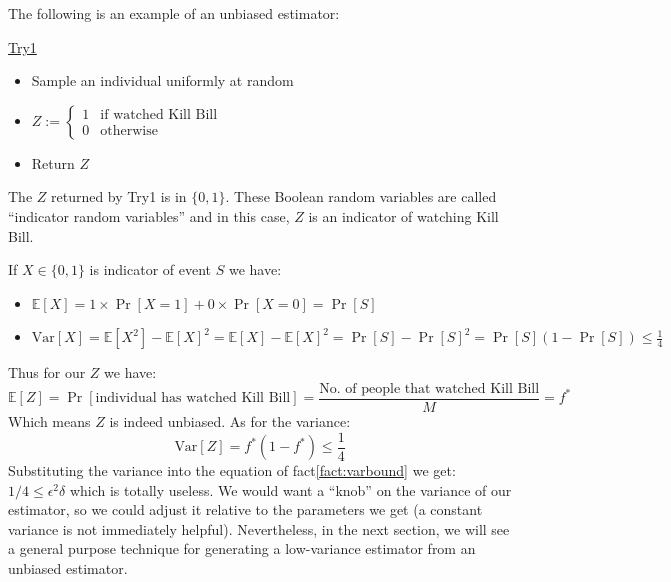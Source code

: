 \documentclass[11pt]{article}
\newcommand{\Ex}{\mathbb{E}}
\newcommand{\Var}{\text{Var}}
\begin{document}
The following is an example of an unbiased estimator:
\begin{mdframed}[backgroundcolor=blue!05,topline=false,bottomline=false,leftline=false,rightline=false] 
	\underline{\sc Try1}
	\begin{itemize}
		\item Sample an individual uniformly at random
		\item $ Z := \begin{cases} 1& \text{if watched Kill Bill}\\
		0 &\text{otherwise} \end{cases}$
		\item Return $Z$
	\end{itemize}
\end{mdframed}
The $Z$ returned by Try1 is in $\{0,1\}$. These Boolean random variables are called ``indicator random variables'' and in this case, $Z$ is an indicator of watching Kill Bill.
\begin{fact}
If $X \in \{0,1\}$ is indicator of event $S$ we have:
\begin{itemize}
    \item $\Ex[X] = 1\times\Pr[X = 1] + 0\times\Pr[X = 0] = \Pr[S]$
    \item $\Var[X] = \Ex[X^2] - \Ex[X]^2 = \Ex[X] - \Ex[X]^2 = \Pr[S] - \Pr[S]^2 = \Pr[S](1-\Pr[S]) \leq \frac{1}{4}$
\end{itemize}
\end{fact}
\noindent
Thus for our $Z$ we have:
\begin{equation*}
    \Ex[Z] = \Pr[\text{individual has watched Kill Bill}] = \frac{\text{No. of people that watched Kill Bill}}{M} = f^*
\end{equation*}
Which means $Z$ is indeed unbiased. As for the variance:
\begin{equation*}
    \Var[Z] = f^*(1-f^*) \leq \frac{1}{4}
\end{equation*}
Substituting the variance into the equation of fact\eqref{fact:varbound} we get: $1/4 \leq \epsilon^2\delta$ which is totally useless. We would want a ``knob'' on the variance of our estimator, so we could adjust it relative to the parameters we get (a constant variance is not immediately helpful). Nevertheless, in the next section, we will see a general purpose technique for generating a low-variance estimator from an unbiased estimator.
\end{document}
